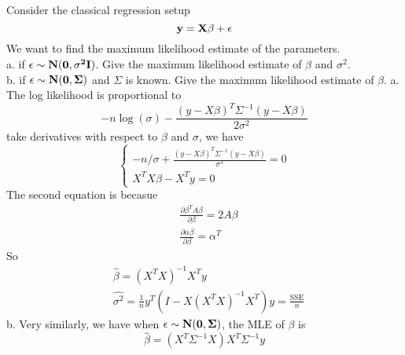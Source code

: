 \documentclass[12pt]{article}
\begin{document}
 {
Consider the classical regression setup
\[\bf{y}=\bf{X}\bf{\beta}+\bf{\epsilon}\]
We want to find the maximum likelihood estimate of the parameters.\\
a. if $\bf{\epsilon}\sim N(\bf{0},\sigma^2\bf{I})$. Give the maximum likelihood estimate of $\beta$ and $\sigma^2$.\\
b. if $\bf{\epsilon}\sim N(\bf{0},\Sigma)$ and $\Sigma$ is known. Give the maximum likelihood estimate of $\beta$.
}
{ \vfill
  \answer
}{ 
  a. The log likelihood is proportional to
  \[-n\log(\sigma)-\frac{(y-X\beta)^T\Sigma^{-1}(y-X\beta)}{2\sigma^2}\]
  take derivatives with respect to $\beta$ and $\sigma$, we have 
  \[\left\{
    \begin{array}{l}  -n/\sigma+\frac{(y-X\beta)^T\Sigma^{-1}(y-X\beta)}{\sigma^3}=0\\
      X^TX\beta-X^Ty=0
     \end{array} \right. \]
  The second equation is becasue
  \begin{align*}
    &\frac{\partial\beta^TA\beta}{\partial \beta}=2A\beta\\
    &\frac{\partial \alpha\beta}{\partial\beta}=\alpha^T
  \end{align*}
  So 
  \begin{align*}
   &\hat{\beta}=(X^TX)^{-1}X^Ty\\
   &\hat{\sigma^2}=\frac{1}{n}y^T(I-X(X^TX)^{-1}X^T)y=\frac{\text{SSE}}{n}
  \end{align*}
b. Very similarly, we have when $\bf{\epsilon}\sim N(\bf{0},\Sigma)$, the MLE of $\beta$ is 
\[\hat{\beta}=(X^T\Sigma^{-1}X)X^T\Sigma^{-1}y\]
}
\end{document}
